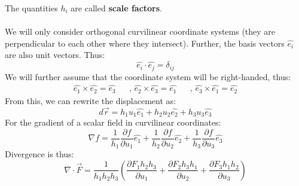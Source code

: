 \documentclass[11pt]{article}
\begin{document}
                    The quantities $h_i$ are called \textbf{scale factors}.\\\\
                    We will only consider orthogonal curvilinear coordinate systems (they are perpendicular to each other where they intersect).
                    Further, the basis vectors $\hat{e_i}$ are also unit vectors.
                    Thus:
                    \begin{equation}
                        \label{eq:equation11}
                        \hat{e_i} \cdot \hat{e_j} = \delta_{ij}
                    \end{equation}
                    We will further assume that the coordinate system will be right-handed, thus:
                    \begin{subequations}
                        \begin{align}
                            \hat{e_1} \times \hat{e_2}  = \hat{e_3} && \text{, } \hat{e_2} \times \hat{e_3}  = \hat{e_1} && \text{, } \hat{e_3} \times \hat{e_1}  = \hat{e_2}
                        \end{align}
                    \end{subequations}
                    From this, we can rewrite the displacement as:
                    \begin{equation}
                        \label{eq:equation12}
                        d\vec{r} = h_1 u_1 \hat{e_1} + h_2 u_2 \hat{e_2} + h_3 u_3 \hat{e_3}
                    \end{equation}
                    For the gradient of a scalar field in curvilinear coordinates:
                    \begin{equation}
                        \label{eq:equation13}
                        \nabla f = \frac{1}{h_1} \frac{\partial f}{\partial u_1} \hat{e_1}
                        + \frac{1}{h_2} \frac{\partial f}{\partial u_2} \hat{e_2}
                         + \frac{1}{h_3} \frac{\partial f}{\partial u_3} \hat{e_3}
                    \end{equation}
                    Divergence is thus:
                    \begin{equation}
                        \label{eq:equation14}
                        \nabla \cdot \vec{F} = \frac{1}{h_1 h_2 h_3}\left( \frac{\partial F_1 h_2 h_3}{\partial u_1}
                        + \frac{\partial F_2 h_3 h_1}{\partial u_2}
                        + \frac{\partial F_3 h_1 h_2}{\partial u_3}
                        \right)
                    \end{equation}
\end{document}
